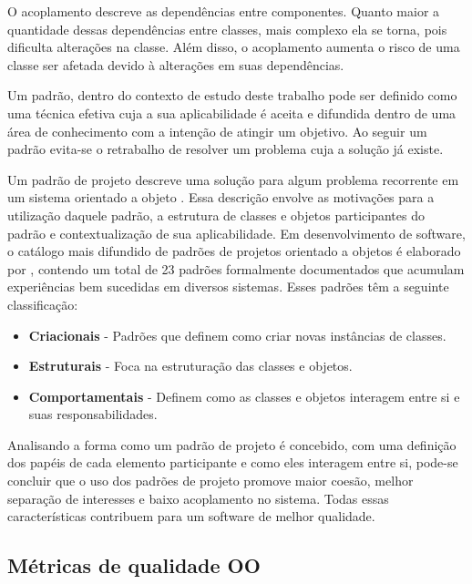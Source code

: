 \documentclass[conference]{IEEEtran}
\begin{document}
O acoplamento descreve as dependências entre componentes. Quanto maior a
quantidade dessas dependências entre classes, mais complexo ela se torna, pois
dificulta  alterações na classe. Além disso, o acoplamento aumenta o risco de
uma classe ser afetada devido à alterações em suas dependências.

Um padrão, dentro do contexto de estudo deste trabalho pode ser definido
como uma técnica efetiva cuja a sua aplicabilidade é aceita e difundida dentro
de uma área de conhecimento com a intenção de atingir um
objetivo\cite{MetskerWake06}. Ao seguir um padrão evita-se o retrabalho de
resolver um problema cuja a solução já existe.

Um padrão de projeto descreve uma solução para algum problema recorrente em um
sistema orientado a objeto \cite{gof}. Essa descrição envolve as motivações para
a utilização daquele padrão, a estrutura de classes e objetos participantes do
padrão e contextualização de sua aplicabilidade. Em desenvolvimento de software,
o catálogo mais difundido de padrões de projetos orientado a objetos é elaborado
por \cite{gof}, contendo um total de 23 padrões formalmente documentados
que acumulam experiências bem sucedidas em diversos sistemas. Esses padrões têm
a seguinte classificação:

\begin{itemize}
\item \textbf{Criacionais} - Padrões que definem como criar novas instâncias de
classes.
\item \textbf{Estruturais} -  Foca na estruturação das classes e objetos.\\
\item \textbf{Comportamentais} - Definem como as classes e objetos interagem
entre si e suas responsabilidades.
\end{itemize}
Analisando a forma como um padrão de projeto é concebido, com uma definição
dos papéis de cada elemento participante e como eles interagem entre si,
pode-se concluir que o uso dos padrões de projeto promove maior coesão, melhor
separação de interesses e baixo acoplamento no sistema. Todas essas
características contribuem para um software de melhor qualidade.




\subsection{Métricas de qualidade OO}
\label{sec:metrics}
\end{document}
